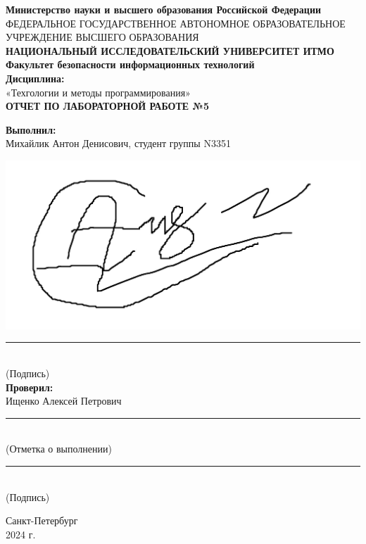 \documentclass[a4paper, 12pt]{article}
\begin{document}
\thispagestyle{empty}
\begin{center}
    \textbf{Министерство науки и высшего образования Российской Федерации}\\
    ФЕДЕРАЛЬНОЕ ГОСУДАРСТВЕННОЕ АВТОНОМНОЕ ОБРАЗОВАТЕЛЬНОЕ УЧРЕЖДЕНИЕ ВЫСШЕГО ОБРАЗОВАНИЯ\\
    \textbf{НАЦИОНАЛЬНЫЙ ИССЛЕДОВАТЕЛЬСКИЙ УНИВЕРСИТЕТ ИТМО}\\[40pt]
    \textbf{Факультет безопасности информационных технологий}\\[40pt]
    \textbf{Дисциплина:}\\[10pt]
    «Техгологии и методы программирования»\\[30pt]
    \textbf{ОТЧЕТ ПО ЛАБОРАТОРНОЙ РАБОТЕ №5}\\[148pt]
\end{center}
\begin{flushright}
    \textbf{Выполнил:}\\[5pt]
    Михайлик Антон Денисович, студент группы N3351
    \begin{minipage}{0.7\textwidth}
        \hfill 
        \end{minipage}%
        \hfill
        \begin{minipage}{0.2\textwidth}
          \includegraphics[width=\linewidth]{sig.jpg}
    \end{minipage}
    \rule{150pt}{1.5pt}\\
    (Подпись)\\[20pt]

    \textbf{Проверил:}\\[5pt]
    Ищенко Алексей Петрович\\[20pt]
    \rule{150pt}{1.5pt}\\
    (Отметка о выполнении)\\[20pt]
    \rule{150pt}{1.5pt}\\
    (Подпись)\\[55pt]
\end{flushright}
\begin{center}
    Санкт-Петербург\\[3pt]
    2024 г.
\end{center}
\end{document}
